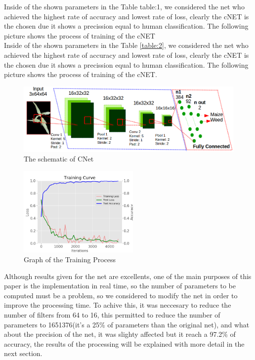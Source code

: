 \documentclass[conference]{IEEEtran}
\begin{document}
Inside of the shown parameters in the Table {table:1}, we considered the net who achieved the highest rate of accuracy and lowest rate of loss, clearly the cNET is the chosen due it shows a precission equal to human classification. The following picture shows the process of training of the cNET \\
Inside of the shown parameters in the Table \ref{table:2}, we considered the net who achieved the highest rate of accuracy and lowest rate of loss, clearly the cNET is the chosen due it shows a precission equal to human classification. The following picture shows the process of training of the cNET. \\

	\begin{figure}[htb]
	\centering
	\includegraphics[width=6.5 in]{arquitectura}
	\caption{ The schematic of CNet }
	\label{fig_sim}
	\end{figure}
	
	\begin{figure}[h]
	\centering
	\includegraphics[width=2.3in]{entrenamiento}
	\caption{ Graph of the Training Process }
	\label{fig_sim}
	\end{figure}


Although results given for the net are excellents, one of the main purposes of this paper is the implementation in real time, so the number of parameters to be computed must be a problem, so we considered to modify the net in order to improve the processing time. To achive this, it was neccesary to reduce the number of filters from 64 to 16, this permitted to reduce the number of parameters to 1651376(it's a 25\% of parameters than the original net), and what about the precision of the net, it was slighty affected but it reach a 97.2\% of accuracy, the results of the processing will be explained with more detail in the next section.
\end{document}
